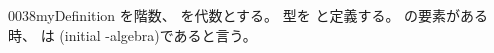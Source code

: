 \documentclass[index]{subfiles}
\begin{document}
\begin{myBlock}{0038}{myDefinition}
  を階数、
  を\myInlineMath{\myNat}代数とする。
  型を
  と定義する。
  の要素がある時、
  は
  (initial \myInlineMath{\myNat}-algebra)であると言う。
\end{myBlock}
\end{document}
